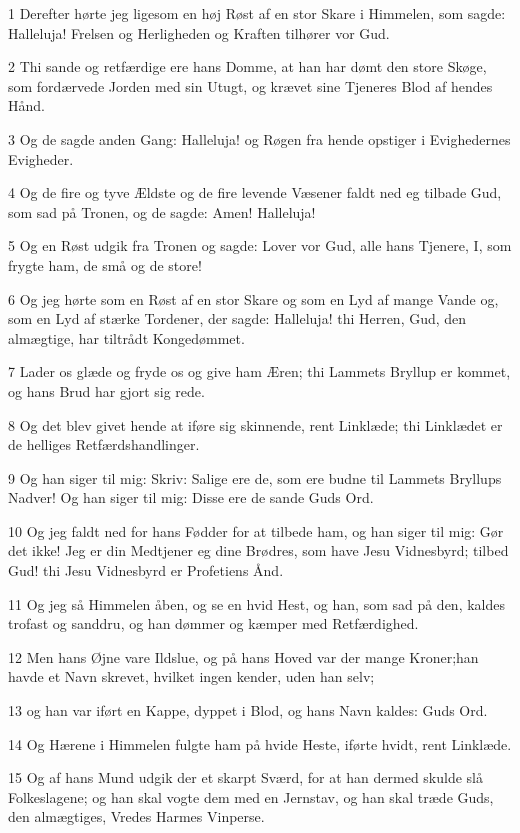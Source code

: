 \par 1 Derefter hørte jeg ligesom en høj Røst af en stor Skare i Himmelen, som sagde: Halleluja! Frelsen og Herligheden og Kraften tilhører vor Gud.
\par 2 Thi sande og retfærdige ere hans Domme, at han har dømt den store Skøge, som fordærvede Jorden med sin Utugt, og krævet sine Tjeneres Blod af hendes Hånd.
\par 3 Og de sagde anden Gang: Halleluja! og Røgen fra hende opstiger i Evighedernes Evigheder.
\par 4 Og de fire og tyve Ældste og de fire levende Væsener faldt ned eg tilbade Gud, som sad på Tronen, og de sagde: Amen! Halleluja!
\par 5 Og en Røst udgik fra Tronen og sagde: Lover vor Gud, alle hans Tjenere, I, som frygte ham, de små og de store!
\par 6 Og jeg hørte som en Røst af en stor Skare og som en Lyd af mange Vande og, som en Lyd af stærke Tordener, der sagde: Halleluja! thi Herren, Gud, den almægtige, har tiltrådt Kongedømmet.
\par 7 Lader os glæde og fryde os og give ham Æren; thi Lammets Bryllup er kommet, og hans Brud har gjort sig rede.
\par 8 Og det blev givet hende at iføre sig skinnende, rent Linklæde; thi Linklædet er de helliges Retfærdshandlinger.
\par 9 Og han siger til mig: Skriv: Salige ere de, som ere budne til Lammets Bryllups Nadver! Og han siger til mig: Disse ere de sande Guds Ord.
\par 10 Og jeg faldt ned for hans Fødder for at tilbede ham, og han siger til mig: Gør det ikke! Jeg er din Medtjener eg dine Brødres, som have Jesu Vidnesbyrd; tilbed Gud! thi Jesu Vidnesbyrd er Profetiens Ånd.
\par 11 Og jeg så Himmelen åben, og se en hvid Hest, og han, som sad på den, kaldes trofast og sanddru, og han dømmer og kæmper med Retfærdighed.
\par 12 Men hans Øjne vare Ildslue, og på hans Hoved var der mange Kroner;han havde et Navn skrevet, hvilket ingen kender, uden han selv;
\par 13 og han var iført en Kappe, dyppet i Blod, og hans Navn kaldes: Guds Ord.
\par 14 Og Hærene i Himmelen fulgte ham på hvide Heste, iførte hvidt, rent Linklæde.
\par 15 Og af hans Mund udgik der et skarpt Sværd, for at han dermed skulde slå Folkeslagene; og han skal vogte dem med en Jernstav, og han skal træde Guds, den almægtiges, Vredes Harmes Vinperse.
